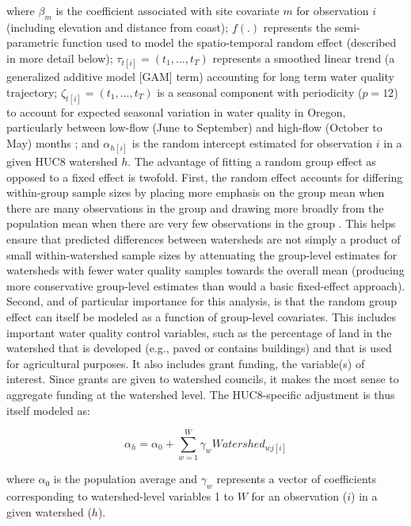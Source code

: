 \documentclass[11pt,a4paper,titlepage]{article}
\begin{document}
where $\beta_{m}$ is the coefficient associated with site covariate $m$ for observation $i$ (including elevation and distance from coast); $f(.)$ represents the semi-parametric function used to model the spatio-temporal random effect (described in more detail below); $\tau_{t[i]}=(t_1,...,t_T)$ represents a smoothed linear trend (a generalized additive model [GAM] term) accounting for long term water quality trajectory;  $\zeta_{t[i]} = (t_1,...,t_T)$ is a seasonal component with periodicity ($p=12$) to account for expected seasonal variation in water quality in Oregon, particularly between low-flow (June to September) and high-flow (October to May) months \parencite{cude2001}; and $\alpha_{h[i]}$ is the random intercept estimated for observation $i$ in a given HUC8 watershed $h$. The advantage of fitting a random group effect as opposed to a fixed effect is twofold. First, the random effect accounts for differing within-group sample sizes by placing more emphasis on the group mean when there are many observations in the group and drawing more broadly from the population mean when there are very few observations in the group \parencite{gelman2006,gelman2013}. This helps ensure that predicted differences between watersheds are not simply a product of small within-watershed sample sizes by attenuating the group-level estimates for watersheds with fewer water quality samples towards the overall mean (producing more conservative group-level estimates than would a basic fixed-effect approach). Second, and of particular importance for this analysis, is that the random group effect can itself be modeled as a function of group-level covariates. This includes important water quality control variables, such as the percentage of land in the watershed that is developed (e.g., paved or contains buildings) and that is used for agricultural purposes. It also includes grant funding, the variable(s) of interest. Since grants are given to watershed councils, it makes the most sense to aggregate funding at the watershed level. The HUC8-specific adjustment is thus itself modeled as:

\begin{equation}
\alpha_{h} = \alpha_{0} + \sum_{w=1}^{W}\gamma_{w}Watershed_{wj[i]}
\label{eq:huc8level}
\end{equation}

where $\alpha_0$ is the population average and $\gamma_w$ represents a vector of coefficients corresponding to watershed-level variables 1 to $W$ for an observation ($i$) in a given watershed ($h$). 
\end{document}
